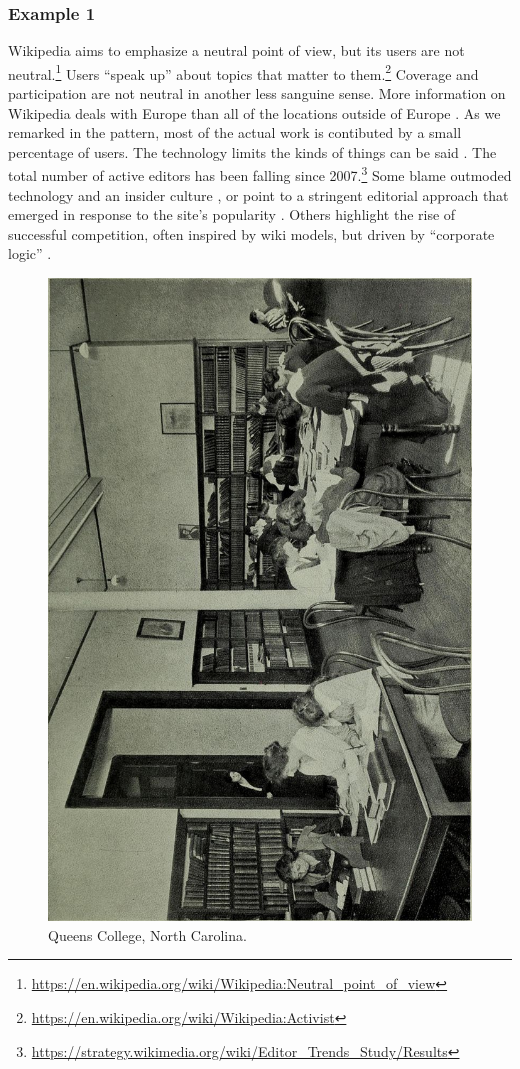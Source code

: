 

\subsubsection*{Example 1}
Wikipedia aims to emphasize a neutral point of view, but its users are
not neutral.\footnote{\url{https://en.wikipedia.org/wiki/Wikipedia:Neutral_point_of_view}}
Users ``speak up'' about topics that matter to them.\footnote{\url{https://en.wikipedia.org/wiki/Wikipedia:Activist}}
Coverage and participation are not neutral in another less sanguine sense.
More information on Wikipedia deals with Europe than
all of the locations outside of Europe \citep{graham2014uneven}.
As we remarked in the  pattern, most of the
actual work is contibuted by a small percentage of users.
%
The technology limits the kinds of things can be said \cite{graham2014uneven}. 
%
The total number of active editors has been falling since
2007.\footnote{\url{https://strategy.wikimedia.org/wiki/Editor_Trends_Study/Results}}
Some blame outmoded technology and an insider culture
\cite{simonite2013decline}, or point to a stringent editorial
approach that emerged in response to the site's popularity
\cite{halfaker13rise}.  Others highlight the rise of successful competition, often inspired by wiki models, but driven by ``corporate logic'' \cite{kreiss2011limits,morellintroductory}.

\begin{figure}
\vspace{-.7cm}
\begin{center}
\includegraphics[width=.24\textwidth,angle=-90,trim=20 0 120 10, clip=true]{ladies-hall}
\end{center}
\vspace{-.5cm}
\captionsetup{font=footnotesize,width=.3\textwidth}
\caption{Queens College, North Carolina.
\label{ladies-hall}}
\vspace{-1.1cm}
\end{figure}

